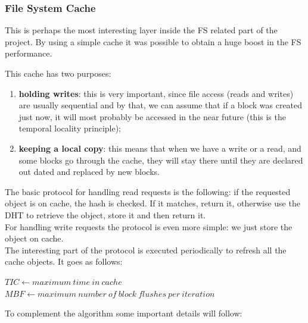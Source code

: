 \documentclass[times,9pt,article]{llncs}
\begin{document}
\subsubsection{File System Cache}

This is perhaps the most interesting layer inside the FS related part of the project. By using a simple cache it was possible to obtain a huge boost in the FS performance.

This cache has two purposes: 
\begin{enumerate}
\item \textbf{holding writes}: this is very important, since file access (reads and writes) are usually sequential and by that, we can assume that if a block was created just now, it will most probably be accessed in the near future (this is the temporal locality principle);
\item \textbf{keeping a local copy}: this means that when we have a write or a read, and some blocks go through the cache, they will stay there until they are declared out dated and replaced by new blocks.
\end{enumerate}
The basic protocol for handling read requests is the following: if the requested object is on cache, the hash is checked. If it matches, return it, otherwise use the DHT to retrieve the object, store it and then return it.\\
For handling write requests the protocol is even more simple: we just store the object on cache.\\
The interesting part of the protocol is executed periodically to refresh all the cache objects. It goes as follows:

\begin{algorithm}[H]
 $TIC \longleftarrow maximum\ time\ in\ cache$\;
 $MBF \longleftarrow maximum\ number\ of\ block\ flushes\ per\ iteration$\;
\end{algorithm}

To complement the algorithm some important details will follow:
\end{document}
